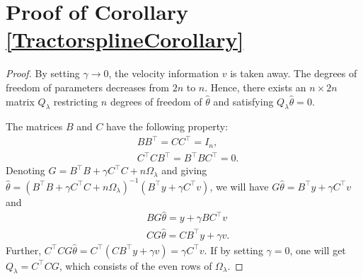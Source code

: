 \section{Proof of Corollary \ref{TractorsplineCorollary}}\label{proofofCorollary}
\begin{proof}
By setting $\gamma\to 0$, the velocity information $v$ is taken away. The degrees of freedom of parameters decreases from $2n$ to $n$. Hence, there exists an $n\times 2n$ matrix $Q_\lambda$ restricting $n$ degrees of freedom of $\hat{\theta}$ and satisfying $Q_\lambda\hat{\theta}=0$.

The matrices $B$ and $C$ have the following property:  
\begin{align*}
& BB^\top=CC^\top=I_n, \\
& C^\top CB^\top=B^\top BC^\top=0.
\end{align*}
Denoting $G=B^\top B+ \gamma C^\top C +n\Omega_\lambda$ and giving $\hat{\theta} =(B^\top B+ \gamma C^\top C +n\Omega_\lambda)^{-1}(B^\top y+\gamma C^\top v)$, we will have $G\hat{\theta}=B^\top y+\gamma C^\top v$ and 
\begin{align*}
& BG\hat{\theta}=y+\gamma BC^\top v\\
& CG\hat{\theta}=CB^\top y+\gamma v.
\end{align*}
Further, $C^\top CG\hat{\theta}=C^\top (CB^\top y+\gamma v) = \gamma C^\top v$. If by setting $\gamma=0$, one will get $Q_\lambda = C^\top CG$, which consists of the even rows of $\Omega_\lambda$.



\end{proof}
